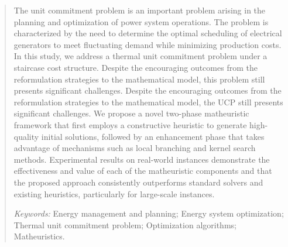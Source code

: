 \documentclass[letterpaper,titlepage,11pt]{article}
\begin{document}
\begin{abstract}
The unit commitment problem is an important problem 
arising in the planning and optimization of power system operations.
The problem is characterized by the need to determine the optimal scheduling of electrical generators to meet fluctuating demand while minimizing production costs.
In this study, we address a thermal unit commitment problem under
a staircase cost structure. 
Despite the encouraging outcomes from the reformulation strategies to the mathematical model, this problem still presents significant challenges.
%
Despite the encouraging outcomes from the reformulation strategies to the mathematical model, the UCP still presents significant challenges.
%
We propose a novel two-phase matheuristic framework that first employs a constructive heuristic to generate high-quality initial solutions, followed by an enhancement phase that takes advantage of mechanisms such as local branching and kernel search methods. 
%
Experimental results on real-world instances demonstrate the effectiveness and value of each of the matheuristic components and that the proposed approach consistently outperforms standard solvers and existing heuristics, particularly for large-scale instances.
%

\vspace{1em}
\noindent\textit{Keywords:} Energy management and planning; Energy system optimization; Thermal unit commitment problem; Optimization algorithms; Matheuristics.
\end{abstract}











 


\newpage
\appendix

\end{document}
